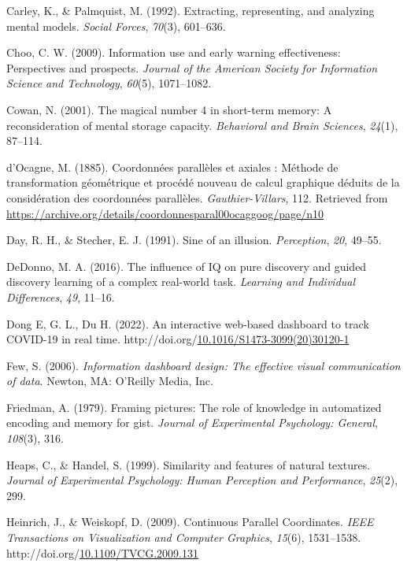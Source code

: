 \documentclass[print]{nuthesis}
\newlength{\cslhangindent}
\newenvironment{CSLReferences}[2]%
{\setlength{\parindent}{0pt}%
\everypar{\setlength{\hangindent}{\cslhangindent}}\ignorespaces}%
{\par}
\begin{document}
\begin{CSLReferences}{1}{0}
\leavevmode\hypertarget{ref-carley1992}{}%
Carley, K., \& Palmquist, M. (1992). Extracting, representing, and analyzing mental models. \emph{Social Forces}, \emph{70}(3), 601--636.

\leavevmode\hypertarget{ref-choo2009}{}%
Choo, C. W. (2009). Information use and early warning effectiveness: Perspectives and prospects. \emph{Journal of the American Society for Information Science and Technology}, \emph{60}(5), 1071--1082.

\leavevmode\hypertarget{ref-cowan2001}{}%
Cowan, N. (2001). The magical number 4 in short-term memory: A reconsideration of mental storage capacity. \emph{Behavioral and Brain Sciences}, \emph{24}(1), 87--114.

\leavevmode\hypertarget{ref-dOcagne:1885}{}%
d'Ocagne, M. (1885). {Coordonnées parallèles et axiales : Méthode de transformation géométrique et procédé nouveau de calcul graphique déduits de la considération des coordonnées parallèles}. \emph{Gauthier-Villars}, 112. Retrieved from \url{https://archive.org/details/coordonnesparal00ocaggoog/page/n10}

\leavevmode\hypertarget{ref-sine}{}%
Day, R. H., \& Stecher, E. J. (1991). Sine of an illusion. \emph{Perception}, \emph{20}, 49--55.

\leavevmode\hypertarget{ref-dedonno}{}%
DeDonno, M. A. (2016). The influence of IQ on pure discovery and guided discovery learning of a complex real-world task. \emph{Learning and Individual Differences}, \emph{49}, 11--16.

\leavevmode\hypertarget{ref-JHPHDashboard}{}%
Dong E, G. L., Du H. (2022). An interactive web-based dashboard to track COVID-19 in real time. http://doi.org/\href{https://doi.org/10.1016/S1473-3099(20)30120-1}{10.1016/S1473-3099(20)30120-1}

\leavevmode\hypertarget{ref-few}{}%
Few, S. (2006). \emph{Information dashboard design: The effective visual communication of data}. Newton, MA: O'Reilly Media, Inc.

\leavevmode\hypertarget{ref-friedman1979}{}%
Friedman, A. (1979). Framing pictures: The role of knowledge in automatized encoding and memory for gist. \emph{Journal of Experimental Psychology: General}, \emph{108}(3), 316.

\leavevmode\hypertarget{ref-heaps1999}{}%
Heaps, C., \& Handel, S. (1999). Similarity and features of natural textures. \emph{Journal of Experimental Psychology: Human Perception and Performance}, \emph{25}(2), 299.

\leavevmode\hypertarget{ref-density-pcp}{}%
Heinrich, J., \& Weiskopf, D. (2009). {Continuous Parallel Coordinates}. \emph{IEEE Transactions on Visualization and Computer Graphics}, \emph{15}(6), 1531--1538. http://doi.org/\href{https://doi.org/10.1109/TVCG.2009.131}{10.1109/TVCG.2009.131}


\end{CSLReferences}
\end{document}

